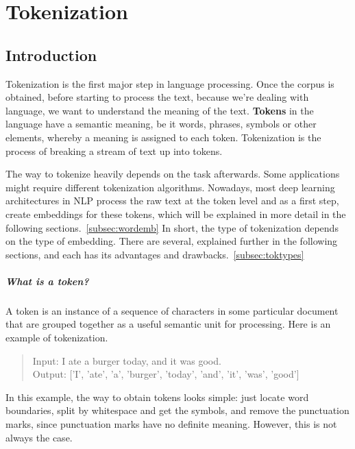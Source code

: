 %
%

\chapter{Tokenization}\label{sec:tokenization}

\section{Introduction}

Tokenization is the first major step in language processing. Once the corpus is obtained, before starting to process the text, because we're dealing with language, we want to understand the meaning of the text. \textbf{Tokens} in the language have a semantic meaning, be it words, phrases, symbols or other elements, whereby a meaning is assigned to each token. Tokenization is the process of breaking a stream of text up into tokens.~\cite{manning2008introduction}

The way to tokenize heavily depends on the task afterwards. Some applications might require different tokenization algorithms. Nowadays, most deep learning architectures in NLP process the raw text at the token level and as a first step, create embeddings for these tokens, which will be explained in more detail in the following sections.~\ref{subsec:wordemb} In short, the type of tokenization depends on the type of embedding. There are several, explained further in the following sections, and each has its advantages and drawbacks.~\ref{subsec:toktypes}

\paragraph{What is a token?}

A token is an instance of a sequence of characters in some particular document that are grouped together as a useful semantic unit for processing. Here is an example of tokenization.

\begin{quote}
    Input: I ate a burger today, and it was good.\\
    Output: ['I', 'ate', 'a', 'burger', 'today', 'and', 'it', 'was', 'good']
\end{quote}

In this example, the way to obtain tokens looks simple: just locate word boundaries, split by whitespace and get the symbols, and remove the punctuation marks, since punctuation marks have no definite meaning. However, this is not always the case.

